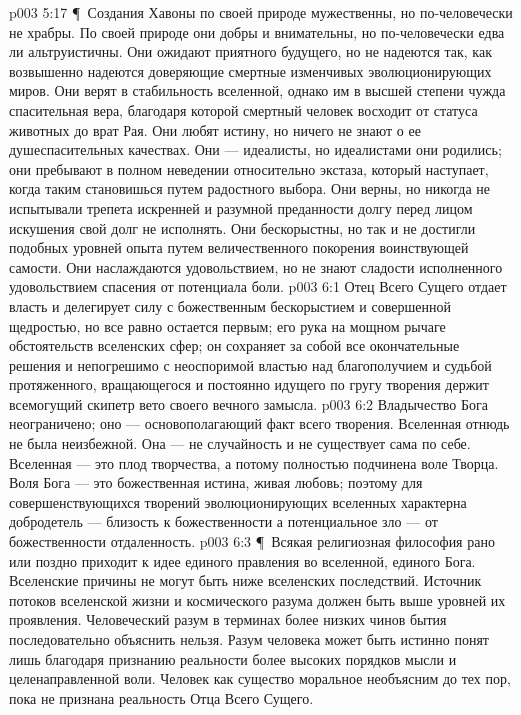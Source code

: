 \vs p003 5:17 \P\ Создания Хавоны по своей природе мужественны, но по\hyp{}человечески не храбры. По своей природе они добры и внимательны, но по\hyp{}человечески едва ли альтруистичны. Они ожидают приятного будущего, но не надеются так, как возвышенно надеются доверяющие смертные изменчивых эволюционирующих миров. Они верят в стабильность вселенной, однако им в высшей степени чужда спасительная вера, благодаря которой смертный человек восходит от статуса животных до врат Рая. Они любят истину, но ничего не знают о ее душеспасительных качествах. Они --- идеалисты, но идеалистами они родились; они пребывают в полном неведении относительно экстаза, который наступает, когда таким становишься путем радостного выбора. Они верны, но никогда не испытывали трепета искренней и разумной преданности долгу перед лицом искушения свой долг не исполнять. Они бескорыстны, но так и не достигли подобных уровней опыта путем величественного покорения воинствующей самости. Они наслаждаются удовольствием, но не знают сладости исполненного удовольствием спасения от потенциала боли.
\vs p003 6:1 Отец Всего Сущего отдает власть и делегирует силу с божественным бескорыстием и совершенной щедростью, но все равно остается первым; его рука на мощном рычаге обстоятельств вселенских сфер; он сохраняет за собой все окончательные решения и непогрешимо с неоспоримой властью над благополучием и судьбой протяженного, вращающегося и постоянно идущего по гругу творения держит всемогущий скипетр вето своего вечного замысла.
\vs p003 6:2 Владычество Бога неограничено; оно --- основополагающий факт всего творения. Вселенная отнюдь не была неизбежной. Она --- не случайность и не существует сама по себе. Вселенная --- это плод творчества, а потому полностью подчинена воле Творца. Воля Бога --- это божественная истина, живая любовь; поэтому для совершенствующихся творений эволюционирующих вселенных характерна добродетель --- близость к божественности а потенциальное зло --- от божественности отдаленность.
\vs p003 6:3 \P\ Всякая религиозная философия рано или поздно приходит к идее единого правления во вселенной, единого Бога. Вселенские причины не могут быть ниже вселенских последствий. Источник потоков вселенской жизни и космического разума должен быть выше уровней их проявления. Человеческий разум в терминах более низких чинов бытия последовательно объяснить нельзя. Разум человека может быть истинно понят лишь благодаря признанию реальности более высоких порядков мысли и целенаправленной воли. Человек как существо моральное необъясним до тех пор, пока не признана реальность Отца Всего Сущего.
